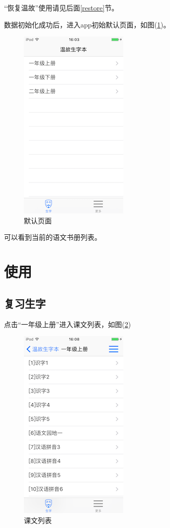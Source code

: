 “恢复温故”使用请见后面\ref{restore}节。

数据初始化成功后，进入app初始默认页面，如图(\ref{img3})。
\begin{figure}[H]
	\centering
	\includegraphics{img/3.png}
	\caption{默认页面}
	\label{img3}
\end{figure}

可以看到当前的语文书册列表。

\section{使用}
\subsection{复习生字}
点击“一年级上册”进入课文列表，如图(\ref{img4})
\begin{figure}[H]
	\centering
	\includegraphics{img/4.png}
	\caption{课文列表}
	\label{img4}
\end{figure}

